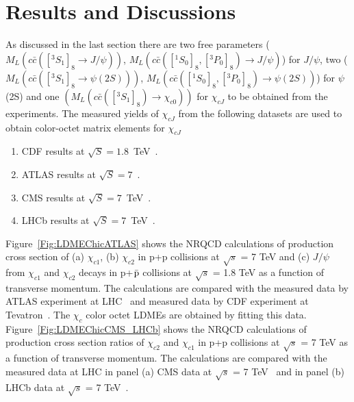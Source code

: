 \documentclass[12pt,a4paper,final]{iopart}
\newcommand{\barc}{{\bar{c}}}
\begin{document}
\section{Results and Discussions}
As discussed in the last section there are two free parameters ($M_{L}(c\barc([^3S_1]_{8}\rightarrow J/\psi))$,
 $M_{L}(c\barc([^1S_0]_{8},[^3P_0]_{8})\rightarrow J/\psi)$) for $J/\psi$, 
two ($M_{L}(c\barc([^3S_1]_{8}\rightarrow \psi(2S)))$, $M_{L}(c\barc([^1S_0]_{8},[^3P_0]_{8})\rightarrow \psi(2S))$)  
for $\psi$(2S) and one $(M_{L}(c\barc([^3S_1]_{8})\rightarrow \chi_{c0}))$ for $\chi_{cJ}$ to be obtained 
from the experiments. 
The measured yields of $\chi_{cJ}$ from the following datasets
are used to obtain color-octet matrix elements for $\chi_{cJ}$ 
\begin{enumerate}
\item{CDF results at $\sqrt{S}=1.8$~TeV~\cite{Abe:1997yz}}.
\item{ATLAS results at $\sqrt{S}=7$~\cite{ATLAS:2014ala}}.
\item{CMS results at $\sqrt{S}=7$~TeV~\cite{Chatrchyan:2012ub}}.
\item{LHCb results at $\sqrt{S}=7$~TeV~\cite{Aaij:2013dja}}.
\end{enumerate}
Figure~\ref{Fig:LDMEChicATLAS} shows the NRQCD calculations of production cross section 
of (a) $\chi_{c1}$, (b) $\chi_{c2}$ in p+p collisions at
$\sqrt{s}$ = 7 TeV and (c) $J/\psi$ from $\chi_{c1}$ and $\chi_{c2}$ 
decays in p+${\bar {\rm p}}$ collisions at $\sqrt{s}$ = 1.8 TeV as 
a function of transverse momentum. The calculations are compared with 
the measured data by ATLAS experiment at LHC~\cite{ATLAS:2014ala}
and measured data by CDF experiment at Tevatron~\cite{Abe:1997yz}. 
The $\chi_{c}$ color octet LDMEs are obtained by fitting this data.
Figure~\ref{Fig:LDMEChicCMS_LHCb} shows
the NRQCD calculations of production cross section ratios 
of $\chi_{c2}$ and $\chi_{c1}$ in p+p collisions at
$\sqrt{s}$ = 7 TeV as a function of transverse momentum. 
The calculations are compared with the measured data at
LHC in panel (a) CMS data at $\sqrt{s}$ = 7 TeV~\cite{Chatrchyan:2012ub}
and in panel (b) LHCb data at $\sqrt{s}$ = 7 TeV~\cite{Aaij:2013dja}.  
\end{document}
